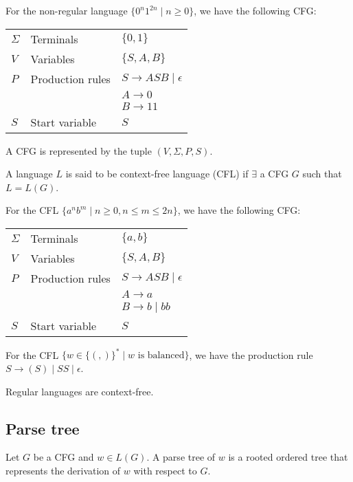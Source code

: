 \documentclass{article}
\begin{document}
For the non-regular language $\{ 0^n1^{2n} \mid n \geq 0 \}$, we have the following CFG: 

\renewcommand*{\arraystretch}{1.4}  
\begin{center}
\begin{tabular}{ l  l  l }
  $\Sigma$ & Terminals & $\{ 0, 1 \}$ \\
  $V$ & Variables & $\{ S, A, B \}$ \\
  $P$ & Production rules & $S \to ASB \mid \epsilon$\\
  &          & $A \to 0$ \\
  &          & $B \to 11$ \\
  $S$ & Start variable & $S$
\end{tabular}
\end{center}

A CFG is represented by the tuple $(V, \Sigma, P, S)$.

A language $L$ is said to be context-free language (CFL) if $\exists$ a CFG $G$ such that $L = L(G)$.

For the CFL $\{ a^nb^m \mid n \geq 0, n \leq m \leq 2n \}$, we have the following CFG:

\renewcommand*{\arraystretch}{1.4}  
\begin{center}
\begin{tabular}{ l  l  l }
  $\Sigma$ & Terminals & $\{ a, b \}$ \\
  $V$ & Variables & $\{ S, A, B \}$ \\
  $P$ & Production rules & $S \to ASB \mid \epsilon$\\
  &          & $A \to a$ \\
  &          & $B \to b \mid bb$ \\
  $S$ & Start variable & $S$
\end{tabular}
\end{center}

For the CFL $\{ w \in \{(, )\}^{*} \mid w \text{ is balanced}\}$, we have the production rule $S \to (S) \mid SS \mid \epsilon$.

Regular languages are context-free.

\subsection{Parse tree}

Let $G$ be a CFG and $w \in L(G)$. A parse tree of $w$ is a rooted ordered tree that represents the derivation of $w$ with respect to $G$.
\end{document}
